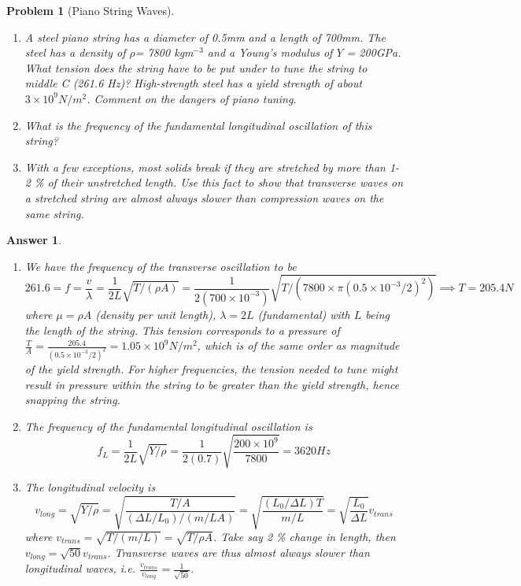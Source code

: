 \documentclass[a4paper]{article}
\newtheorem{ans}{Answer}[section]
\theoremstyle{new}
\newtheorem{qns}{Problem}[section]
\begin{document}
\begin{qns}[Piano String Waves]\leavevmode
\begin{enumerate}[label=(\alph*)]
\item A steel piano string has a diameter of 0.5mm and a length of 700mm. The steel has a density of $\rho$= 7800 kgm$^{-3}$ and a Young’s modulus of $Y$ = 200GPa. What tension does the string have to be put under to tune the string to middle C (261.6 Hz)? High-strength steel has a yield strength of about $3\times10^9N/m^2$. Comment on the dangers of piano tuning.
\item What is the frequency of the fundamental longitudinal oscillation of this string?
\item With a few exceptions, most solids break if they are stretched by more than 1-2 \% of their unstretched length. Use this fact to show that transverse waves on a stretched string are almost always slower than compression waves on the same string.
\end{enumerate}
\end{qns}
\begin{ans}\leavevmode
\begin{enumerate}[label=(\alph*)]
\item We have the frequency of the transverse oscillation to be $$261.6=f=\frac{v}{\lambda}=\frac{1}{2L}\sqrt{T/(\rho A)}=\frac{1}{2(700\times10^{-3})}\sqrt{T/(7800\times\pi(0.5\times10^{-3}/2)^2)}\implies T=205.4 N$$ where $\mu=\rho A$ (density per unit length), $\lambda=2L$ (fundamental) with $L$ being the length of the string. This tension corresponds to a pressure of $\frac{T}{A}=\frac{205.4}{(0.5\times10^{-3}/2)^2}=1.05\times10^9N/m^2$, which is of the same order as magnitude of the yield strength. For higher frequencies, the tension needed to tune might result in pressure within the string to be greater than the yield strength, hence snapping the string.
\item The frequency of the fundamental longitudinal oscillation is $$f_L=\frac{1}{2L}\sqrt{Y/\rho}=\frac{1}{2(0.7)}\sqrt{\frac{200\times10^9}{7800}}=3620 Hz$$
\item The longitudinal velocity is 
$$v_{long}=\sqrt{Y/\rho}=\sqrt{\frac{T/A}{(\Delta L/L_0)/(m/LA)}}=\sqrt{\frac{(L_0/\Delta L)T}{m/L}}=\sqrt{\frac{L_0}{\Delta L}}v_{trans}$$
where $v_{trans}=\sqrt{T/(m/L)}=\sqrt{T/\rho A}$. Take say 2 \% change in length, then $v_{long}=\sqrt{50}v_{trans}$. Transverse waves are thus almost always slower than longitudinal waves, i.e. $\frac{v_{trans}}{v_{long}}=\frac{1}{\sqrt{50}}$. 
\end{enumerate}
\end{ans}
\end{document}
